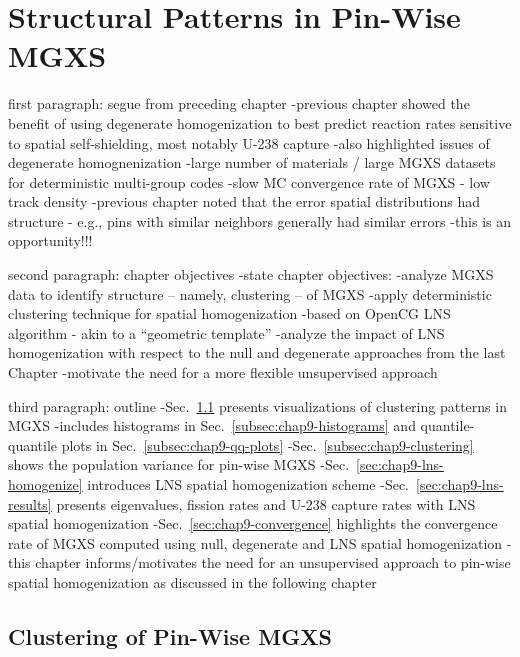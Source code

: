 \chapter{Structural Patterns in Pin-Wise MGXS}
\label{chap:spatial}

first paragraph: segue from preceding chapter
-previous chapter showed the benefit of using degenerate homogenization to best predict reaction rates sensitive to spatial self-shielding, most notably U-238 capture
-also highlighted issues of degenerate homognenization
  -large number of materials / large \ac{MGXS} datasets for deterministic multi-group codes
  -slow \ac{MC} convergence rate of \ac{MGXS} - low track density
-previous chapter noted that the error spatial distributions had structure - e.g., pins with similar neighbors generally had similar errors
  -this is an opportunity!!!

second paragraph: chapter objectives
-state chapter objectives:
  -analyze \ac{MGXS} data to identify structure -- namely, clustering -- of \ac{MGXS}
  -apply deterministic clustering technique for spatial homogenization
    -based on OpenCG \ac{LNS} algorithm - akin to a ``geometric template''
  -analyze the impact of \ac{LNS} homogenization with respect to the null and degenerate approaches from the last Chapter
  -motivate the need for a more flexible unsupervised approach

third paragraph: outline
-Sec.~\ref{sec:chap9-clustering} presents visualizations of clustering patterns in \ac{MGXS}
  -includes histograms in Sec.~\ref{subsec:chap9-histograms} and quantile-quantile plots in Sec.~\ref{subsec:chap9-qq-plots}
  -Sec.~\ref{subsec:chap9-clustering} shows the population variance for pin-wise \ac{MGXS}
-Sec.~\ref{sec:chap9-lns-homogenize} introduces \ac{LNS} spatial homogenization scheme
-Sec.~\ref{sec:chap9-lns-results} presents eigenvalues, fission rates and U-238 capture rates with \ac{LNS} spatial homogenization
-Sec.~\ref{sec:chap9-convergence} highlights the convergence rate of \ac{MGXS} computed using null, degenerate and \ac{LNS} spatial homogenization
-this chapter informs/motivates the need for an unsupervised approach to pin-wise spatial homogenization as discussed in the following chapter

\section{Clustering of Pin-Wise MGXS}
\label{sec:chap9-clustering}


